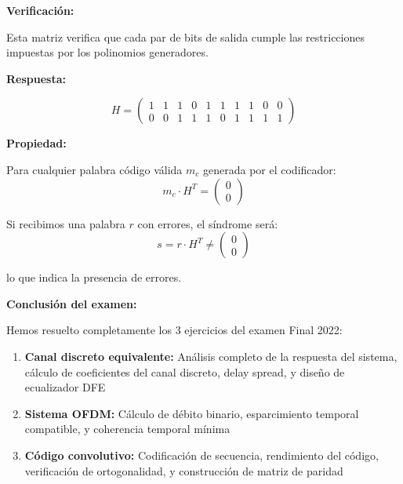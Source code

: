 \documentclass[11pt,a4paper]{article}
\begin{document}
\textbf{Verificaci\'on:}

Esta matriz verifica que cada par de bits de salida cumple las restricciones impuestas por los polinomios generadores.

\textbf{Respuesta:}

\[
\boxed{H = \begin{pmatrix}
1 & 1 & 1 & 0 & 1 & 1 & 1 & 1 & 0 & 0 \\
0 & 0 & 1 & 1 & 1 & 0 & 1 & 1 & 1 & 1
\end{pmatrix}}
\]

\textbf{Propiedad:}

Para cualquier palabra c\'odigo v\'alida $m_c$ generada por el codificador:
\[
m_c \cdot H^T = \begin{pmatrix} 0 \\ 0 \end{pmatrix}
\]

Si recibimos una palabra $r$ con errores, el s\'indrome ser\'a:
\[
s = r \cdot H^T \neq \begin{pmatrix} 0 \\ 0 \end{pmatrix}
\]

lo que indica la presencia de errores.

\vspace{1cm}

\textbf{Conclusi\'on del examen:}

Hemos resuelto completamente los 3 ejercicios del examen Final 2022:

\begin{enumerate}
    \item \textbf{Canal discreto equivalente:} An\'alisis completo de la respuesta del sistema, c\'alculo de coeficientes del canal discreto, delay spread, y dise\~no de ecualizador DFE
    
    \item \textbf{Sistema OFDM:} C\'alculo de d\'ebito binario, esparcimiento temporal compatible, y coherencia temporal m\'inima
    
    \item \textbf{C\'odigo convolutivo:} Codificaci\'on de secuencia, rendimiento del c\'odigo, verificaci\'on de ortogonalidad, y construcci\'on de matriz de paridad
\end{enumerate}
\end{document}
